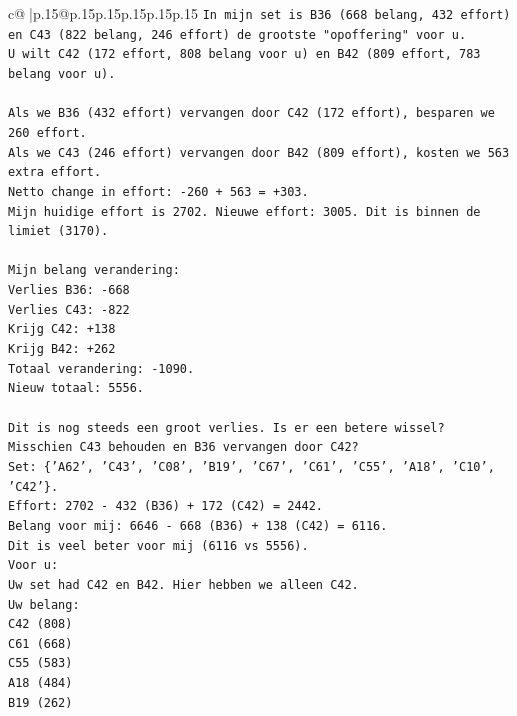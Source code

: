 \documentclass{article}
\begin{document}
{\begin{supertabular}{c@{$\;$}|p{.15\linewidth}@{}p{.15\linewidth}p{.15\linewidth}p{.15\linewidth}p{.15\linewidth}p{.15\linewidth}}
{{{\texttt{In mijn set is B36 (668 belang, 432 effort) en C43 (822 belang, 246 effort) de grootste "opoffering" voor u.} \\
\texttt{U wilt C42 (172 effort, 808 belang voor u) en B42 (809 effort, 783 belang voor u).} \\
\\ 
\texttt{Als we B36 (432 effort) vervangen door C42 (172 effort), besparen we 260 effort.} \\
\texttt{Als we C43 (246 effort) vervangen door B42 (809 effort), kosten we 563 extra effort.} \\
\texttt{Netto change in effort: {-}260 + 563 = +303.} \\
\texttt{Mijn huidige effort is 2702. Nieuwe effort: 3005. Dit is binnen de limiet (3170).} \\
\\ 
\texttt{Mijn belang verandering:} \\
\texttt{Verlies B36: {-}668} \\
\texttt{Verlies C43: {-}822} \\
\texttt{Krijg C42: +138} \\
\texttt{Krijg B42: +262} \\
\texttt{Totaal verandering: {-}1090.} \\
\texttt{Nieuw totaal: 5556.} \\
\\ 
\texttt{Dit is nog steeds een groot verlies. Is er een betere wissel?} \\
\texttt{Misschien C43 behouden en B36 vervangen door C42?} \\
\texttt{Set: \{'A62', 'C43', 'C08', 'B19', 'C67', 'C61', 'C55', 'A18', 'C10', 'C42'\}.} \\
\texttt{Effort: 2702 {-} 432 (B36) + 172 (C42) = 2442.} \\
\texttt{Belang voor mij: 6646 {-} 668 (B36) + 138 (C42) = 6116.} \\
\texttt{Dit is veel beter voor mij (6116 vs 5556).} \\
\texttt{Voor u:} \\
\texttt{Uw set had C42 en B42. Hier hebben we alleen C42.} \\
\texttt{Uw belang:} \\
\texttt{C42 (808)} \\
\texttt{C61 (668)} \\
\texttt{C55 (583)} \\
\texttt{A18 (484)} \\
\texttt{B19 (262)} \\
}}}
\end{supertabular}}
\end{document}

